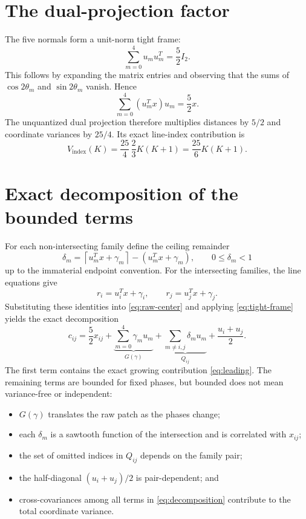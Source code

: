 \documentclass[11pt]{article}
\begin{document}
\section{The dual-projection factor}

The five normals form a unit-norm tight frame:
\begin{equation}
  \sum_{m=0}^4u_m u_m^T=\frac52 I_2.
  \label{eq:tight-frame}
\end{equation}
This follows by expanding the matrix entries and observing that the sums of
\(\cos 2\theta_m\) and \(\sin 2\theta_m\) vanish.  Hence
\[
  \sum_{m=0}^4(u_m^Tx)u_m=\frac52x.
\]
The unquantized dual projection therefore multiplies distances by \(5/2\)
and coordinate variances by \(25/4\).  Its exact line-index contribution is
\begin{equation}
  V_{\mathrm{index}}(K)
  =
  \frac{25}{4}\,
  \frac{2}{3}K(K+1)
  =
  \boxed{\frac{25}{6}K(K+1)}.
  \label{eq:leading}
\end{equation}

\section{Exact decomposition of the bounded terms}

For each non-intersecting family define the ceiling remainder
\[
  \delta_m
  =
  \left\lceil u_m^Tx+\gamma_m\right\rceil
  -(u_m^Tx+\gamma_m),
  \qquad 0\le\delta_m<1
\]
up to the immaterial endpoint convention.  For the intersecting families,
the line equations give
\[
  r_i=u_i^Tx+\gamma_i,\qquad
  r_j=u_j^Tx+\gamma_j.
\]
Substituting these identities into \eqref{eq:raw-center} and applying
\eqref{eq:tight-frame} yields the exact decomposition
\begin{equation}
  c_{ij}
  =
  \frac52x_{ij}
  +\underbrace{\sum_{m=0}^4\gamma_m u_m}_{G(\gamma)}
  +\underbrace{\sum_{m\ne i,j}\delta_m u_m}_{Q_{ij}}
  +\frac{u_i+u_j}{2}.
  \label{eq:decomposition}
\end{equation}
The first term contains the exact growing contribution
\eqref{eq:leading}.  The remaining terms are bounded for fixed phases, but
bounded does not mean variance-free or independent:
\begin{itemize}
  \item \(G(\gamma)\) translates the raw patch as the phases change;
  \item each \(\delta_m\) is a sawtooth function of the intersection and
    is correlated with \(x_{ij}\);
  \item the set of omitted indices in \(Q_{ij}\) depends on the family pair;
  \item the half-diagonal \((u_i+u_j)/2\) is pair-dependent; and
  \item cross-covariances among all terms in \eqref{eq:decomposition}
    contribute to the total coordinate variance.
\end{itemize}
\end{document}
